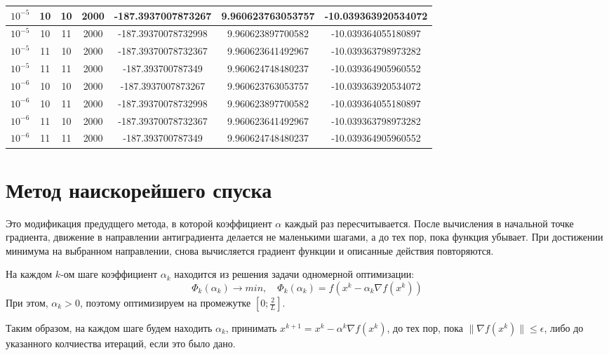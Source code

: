 \documentclass[12pt]{article}
\begin{document}
\begin{table}[h]
\begin{tabular}{|c|c|c|c|c|c|c|}
$10^{-5}$ & 10 & 10 & 2000 & -187.3937007873267  & 9.960623763053757 & -10.039363920534072 \\ \hline
$10^{-5}$ & 10 & 11 & 2000 & -187.39370078732998 & 9.960623897700582 & -10.039364055180897 \\ \hline
$10^{-5}$ & 11 & 10 & 2000 & -187.39370078732367 & 9.960623641492967 & -10.039363798973282 \\ \hline
$10^{-5}$ & 11 & 11 & 2000 & -187.393700787349   & 9.960624748480237 & -10.039364905960552 \\ \hline
$10^{-6}$ & 10 & 10 & 2000 & -187.3937007873267  & 9.960623763053757 & -10.039363920534072 \\ \hline
$10^{-6}$ & 10 & 11 & 2000 & -187.39370078732998 & 9.960623897700582 & -10.039364055180897 \\ \hline
$10^{-6}$ & 11 & 10 & 2000 & -187.39370078732367 & 9.960623641492967 & -10.039363798973282 \\ \hline
$10^{-6}$ & 11 & 11 & 2000 & -187.393700787349   & 9.960624748480237 & -10.039364905960552 \\ \hline
\end{tabular}
\end{table}


\newpage
\section{Метод наискорейшего спуска}

Это модификация предудщего метода, в которой коэффициент $\alpha$ каждый раз пересчитывается. После вычисления в начальной точке градиента, движение в направлении антиградиента делается не маленькими шагами, а до тех пор, пока функция убывает. При достижении минимума на выбранном направлении, снова вычисляется градиент функции и описанные действия повторяются.

На каждом $k$-ом шаге коэффициент $\alpha_k$ находится из решения задачи одномерной оптимизации:
\[ \Phi_k (\alpha_k) \rightarrow min, \quad  \Phi_k (\alpha_k) = f(x^k - \alpha_k \nabla f(x^k)) \]
При этом, $\alpha_k > 0$, поэтому оптимизируем на промежутке $\left[ 0; \frac{2}{L} \right]$.

Таким образом, на каждом шаге будем находить $\alpha_k$, принимать $x^{k+1} = x^{k} - \alpha^{k} \nabla f(x^k)$, до тех пор, пока $\lVert \nabla f(x^k) \rVert \leqslant \epsilon$, либо до указанного колчиества итераций, если это было дано.
\end{document}
